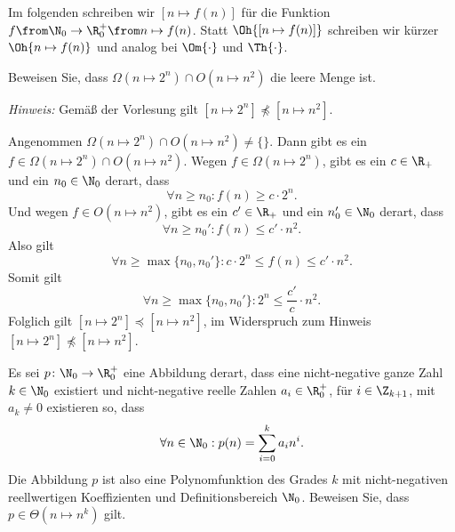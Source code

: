 \documentclass[12pt]{article}
\begin{document}

\noindent
Im folgenden schreiben wir $[n\mapsto f(n)]$ für die Funktion
$f\from\N_0\to\R_0^+\from n \mapsto f(n)$. Statt
$\Oh{[n\mapsto f(n)]}$ schreiben wir kürzer $\Oh{n\mapsto f(n)}$ und
analog bei $\Om{\cdot}$ und $\Th{\cdot}$.
\\


\begin{aufgabe}[4]
  Beweisen Sie, dass $\Omega(n \mapsto 2^n) \cap O(n \mapsto n^2)$ die leere Menge ist.

  \emph{Hinweis:} Gemäß der Vorlesung gilt $[n \mapsto 2^n] \npreceq [n \mapsto n^2]$.
\end{aufgabe}

\begin{loesung}
  Angenommen $\Omega(n \mapsto 2^n) \cap O(n \mapsto n^2) \neq \{\}$. Dann gibt es ein $f \in \Omega(n \mapsto 2^n) \cap O(n \mapsto n^2)$. Wegen $f \in \Omega(n \mapsto 2^n)$, gibt es ein $c \in \R_+$ und ein $n_0 \in \N_0$ derart, dass
  \begin{equation*}
    \forall n \geq n_0 : f(n) \geq c \cdot 2^n.
  \end{equation*}
  Und wegen $f \in O(n \mapsto n^2)$, gibt es ein $c' \in \R_+$ und ein $n_0' \in \N_0$ derart, dass
  \begin{equation*}
    \forall n \geq n_0' : f(n) \leq c' \cdot n^2.
  \end{equation*}
  Also gilt
  \begin{equation*}
    \forall n \geq \max\{n_0, n_0'\} : c \cdot 2^n \leq f(n) \leq c' \cdot n^2.
  \end{equation*}
  Somit gilt
  \begin{equation*}
    \forall n \geq \max\{n_0, n_0'\} : 2^n \leq \frac{c'}{c} \cdot n^2.
  \end{equation*}
  Folglich gilt $[n \mapsto 2^n] \preceq [n \mapsto n^2]$, im Widerspruch zum Hinweis $[n \mapsto 2^n] \npreceq [n \mapsto n^2]$. %
\end{loesung}


\begin{aufgabe}[4]
  Es sei $p \colon \N_0 \to \R_0^+$ eine Abbildung derart, dass eine nicht-negative ganze Zahl $k \in \N_0$ existiert und nicht-negative reelle Zahlen $a_i \in \R_0^+$, für $i \in \Z_{k + 1}$, mit $a_k \neq 0$ existieren so, dass
  \begin{equation*}
    \forall n \in \N_0 : p(n) = \sum_{i = 0}^k a_i n^i.
  \end{equation*}
  Die Abbildung $p$ ist also eine Polynomfunktion des Grades $k$ mit nicht-negativen reellwertigen Koeffizienten und Definitionsbereich $\N_0$. Beweisen Sie, dass $p \in \Theta(n \mapsto n^k)$ gilt.
\end{aufgabe}
\end{document}
